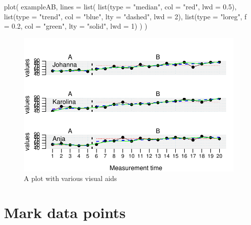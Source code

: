 \documentclass[
  letterpaper,
  DIV=11,
  numbers=noendperiod]{scrreprt}
\newenvironment{Shaded}{\begin{snugshade}}{\end{snugshade}}
\newcommand{\AttributeTok}[1]{\textcolor[rgb]{0.40,0.45,0.13}{#1}}
\newcommand{\DecValTok}[1]{\textcolor[rgb]{0.68,0.00,0.00}{#1}}
\newcommand{\FloatTok}[1]{\textcolor[rgb]{0.68,0.00,0.00}{#1}}
\newcommand{\FunctionTok}[1]{\textcolor[rgb]{0.28,0.35,0.67}{#1}}
\newcommand{\NormalTok}[1]{\textcolor[rgb]{0.00,0.23,0.31}{#1}}
\newcommand{\StringTok}[1]{\textcolor[rgb]{0.13,0.47,0.30}{#1}}
\begin{document}
\begin{Shaded}
\begin{Highlighting}[]
\FunctionTok{plot}\NormalTok{(}
\NormalTok{  exampleAB, }
  \AttributeTok{lines =} \FunctionTok{list}\NormalTok{(}
    \FunctionTok{list}\NormalTok{(}\AttributeTok{type =} \StringTok{"median"}\NormalTok{, }\AttributeTok{col =} \StringTok{"red"}\NormalTok{, }\AttributeTok{lwd =} \FloatTok{0.5}\NormalTok{),}
    \FunctionTok{list}\NormalTok{(}\AttributeTok{type =} \StringTok{"trend"}\NormalTok{, }\AttributeTok{col =} \StringTok{"blue"}\NormalTok{, }\AttributeTok{lty =} \StringTok{"dashed"}\NormalTok{, }\AttributeTok{lwd =} \DecValTok{2}\NormalTok{),}
    \FunctionTok{list}\NormalTok{(}\AttributeTok{type =} \StringTok{"loreg"}\NormalTok{, }\AttributeTok{f =} \FloatTok{0.2}\NormalTok{, }\AttributeTok{col =} \StringTok{"green"}\NormalTok{, }\AttributeTok{lty =} \StringTok{"solid"}\NormalTok{, }\AttributeTok{lwd =} \DecValTok{1}\NormalTok{)}
\NormalTok{  )}
\NormalTok{)}
\end{Highlighting}
\end{Shaded}

\begin{figure}[H]

{\centering \includegraphics{./app_supseded_functions_files/figure-pdf/ex-plot-lines-1.pdf}

}

\caption{A plot with various visual aids}

\end{figure}

\hypertarget{mark-data-points}{%
\section{Mark data points}\label{mark-data-points}}
\end{document}
